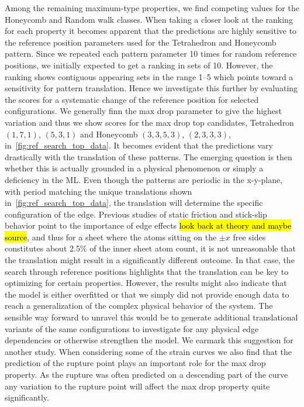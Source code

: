 Among the remaining maximum-type properties, we find competing values for the
Honeycomb and Random walk classes. When taking a closer look at the ranking for
each property it becomes apparent that the predictions are highly sensitive to
the reference position parameters used for the Tetrahedron and Honeycomb
pattern. Since we repeated each pattern parameter 10 times for random reference
positions, we initially expected to get a ranking in sets of 10. However, the
ranking shows contiguous appearing sets in the range 1--5 which points toward a
sensitivity for pattern translation. Hence we investigate this further by
evaluating the scores for a systematic change of the reference position for
selected configurations. We generally finn the max drop parameter to give the
highest variation and thus we show scores for the max drop top candidates,
Tetrahedron $(1,7,1)$, $(5,3,1)$ and Honeycomb $(3,3,5,3)$, $(2,3,3,3)$, in~\cref{fig:ref_search_top_data}. It becomes evident that the predictions vary
drastically with the translation of these patterns. The emerging question is
then whether this is actually grounded in a physical phenomenon or simply a
deficiency in the \acrshort{ML}. Even though the patterns are periodic in the
x-y-plane, with period matching the unique translations shown in~\cref{fig:ref_search_top_data}, the translation will determine the specific
configuration of the edge. Previous studies of static friction and stick-slip
behavior point to the importance of edge effects \hl{look back at theory and
maybe source}, and thus for a sheet where the atoms sitting on the $\pm x$ free
sides constitutes about 2.5\% of the inner sheet atom count, it is not
unreasonable that the translation might result in a significantly different
outcome. In that case, the search through reference positions highlights that
the translation can be key to optimizing for certain properties. However, the
results might also indicate that the model is either overfitted or that we
simply did not provide enough data to reach a generalization of the complex
physical behavior of the system. The sensible way forward to unravel this would
be to generate additional translational variants of the same configurations to
investigate for any physical edge dependencies or otherwise strengthen the
model. We earmark this suggestion for another study. When considering some of
the strain curves we also find that the prediction of the rupture point plays
an important role for the max drop property. As the rupture was often predicted
on a descending part of the curve any variation to the rupture point will affect
the max drop property quite significantly.


